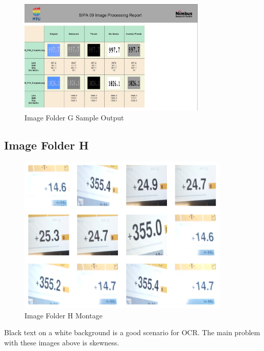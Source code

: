 \begin{figure}[ht]
    \centering
    \includegraphics[width=0.8\textwidth]{Figures/Methodology/sipa_09/sample_output.jpg}
    \caption[Image Folder G Sample Output]{Image Folder G Sample Output}
    \label{fig:Image Folder G Sample Output}
\end{figure}

\newpage
\subsection{Image Folder H}

\begin{figure}[ht]
    \centering
    \includegraphics[width=0.9\textwidth]{Figures/EDA_Charts/11/montage.png}
    \caption[Image Folder H Montage]{Image Folder H Montage}
    \label{fig:Image Folder H Montage}
\end{figure}

Black text on a white background is a good scenario for OCR. The main problem with these images above is skewness.

